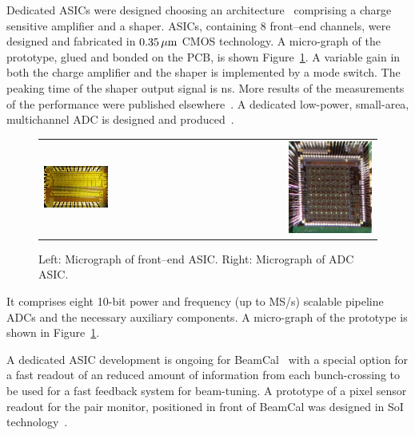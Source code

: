 Dedicated ASICs were designed choosing
an
architecture~\cite{Boie1982365,Gatti:1986qq}
comprising a charge sensitive amplifier and a shaper.
ASICs, containing 8 front--end channels, were designed and fabricated in $\unit[0.35]{\micron}$ CMOS technology.
A micro-graph of the prototype, glued and bonded on the PCB, is shown Figure~\ref{fig:frontend_photo}.
A variable gain in both the charge amplifier and
the shaper is implemented by a mode switch. The peaking time of the shaper output signal is \unit[60]{ns}.
More results of the measurements of the performance were published elsewhere~\cite{4600902}.
A dedicated low-power, small-area, multichannel ADC is designed and produced~\cite{6156491}.
\begin{figure}[hbp]
\begin{center}
 \begin{tabular}{rrr}
    \includegraphics[width=0.4\columnwidth]{Calorimeter/FCAL/figs/fcal_lumical_fe_photo}
     &~~~~~~&
 \includegraphics[width=0.4\textwidth,height=0.28\textwidth]{Calorimeter/FCAL/figs/adc_asic_photo.png} \\

\end{tabular}
   \end{center}
          \caption{Left: Micrograph of front--end ASIC.
               Right: Micrograph of ADC ASIC.}
    \label{fig:frontend_photo}
\end{figure}
It comprises eight 10-bit power and frequency (up to \unit[24]{MS/s}) scalable pipeline ADCs and the necessary
auxiliary components.
A micro-graph of the prototype is shown in Figure~\ref{fig:frontend_photo}.

A dedicated ASIC development is ongoing for BeamCal~\cite{6200898}
with a special option for a fast readout of an reduced amount of
information from each bunch-crossing to be used for a fast feedback system for beam-tuning.
A prototype of a pixel sensor readout for the pair monitor, positioned in front of BeamCal was designed in SoI
technology~\cite{Sato201153}.

